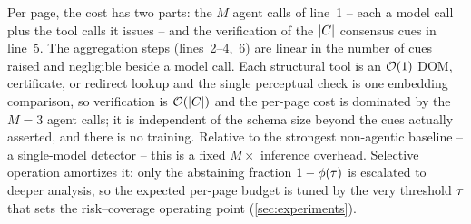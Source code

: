 Per page, the cost has two parts: the $M$ agent calls of line~1 -- each a model call
plus the tool calls it issues -- and the verification of the $\lvert C\rvert$
consensus cues in line~5. The aggregation steps (lines~2--4,~6) are linear in the
number of cues raised and negligible beside a model call. Each structural tool is an
$\mathcal{O}(1)$ DOM, certificate, or redirect lookup and the single perceptual check is one
embedding comparison, so verification is $\mathcal{O}(\lvert C\rvert)$ and the per-page cost
is dominated by the $M{=}3$ agent calls; it is independent of the schema size beyond
the cues actually asserted, and there is no training. Relative to the strongest
non-agentic baseline -- a single-model detector -- this is a fixed $M{\times}$ inference
overhead. Selective operation amortizes it: only the abstaining fraction
$1-\phi(\tau)$ is escalated to deeper analysis, so the expected per-page budget is tuned
by the very threshold $\tau$ that sets the risk--coverage operating point
(\autoref{sec:experiments}).
